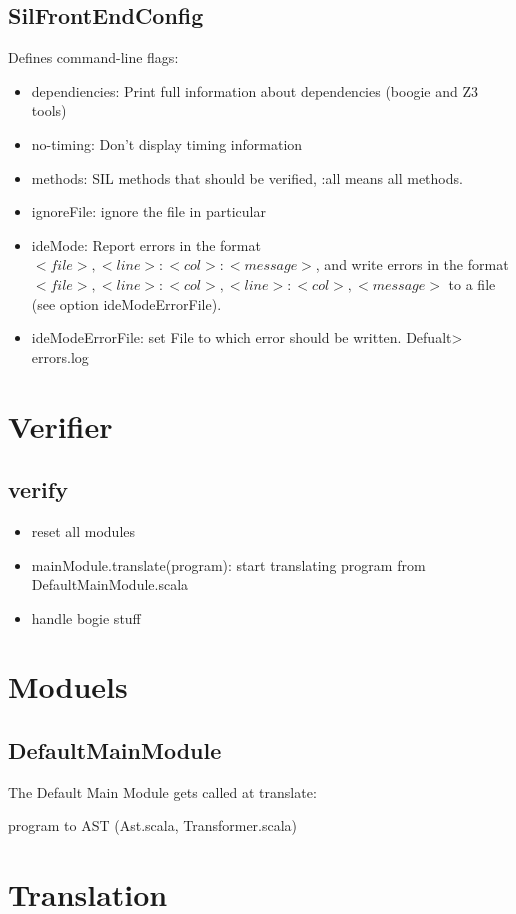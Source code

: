 \documentclass[12pt]{article}
\begin{document}
\subsection{SilFrontEndConfig}
Defines command-line flags:
\begin{itemize}
\item dependiencies: Print full information about dependencies (boogie and Z3 tools)
\item no-timing: Don't display timing information
\item methods: SIL methods that should be verified, :all means all methods.
\item ignoreFile: ignore the file in particular
\item ideMode: Report errors in the format $<file>,<line>:<col>: <message>$, and write errors in the format $<file>,<line>:<col>,<line>:<col>,<message>$ to a file (see option ideModeErrorFile).
\item ideModeErrorFile: set File to which error should be written. Defualt> errors.log
\end{itemize}

\section{Verifier}
\subsection{verify}
\begin{itemize}
\item reset all modules
\item mainModule.translate(program): start translating program from DefaultMainModule.scala
\item handle bogie stuff
\end{itemize}

\section{Moduels}

\subsection{DefaultMainModule}
The Default Main Module gets called at translate:
\begin{itemize}
\exchange program to AST (Ast.scala, Transformer.scala)
\end{itemize}


\section{Translation}
\end{document}
